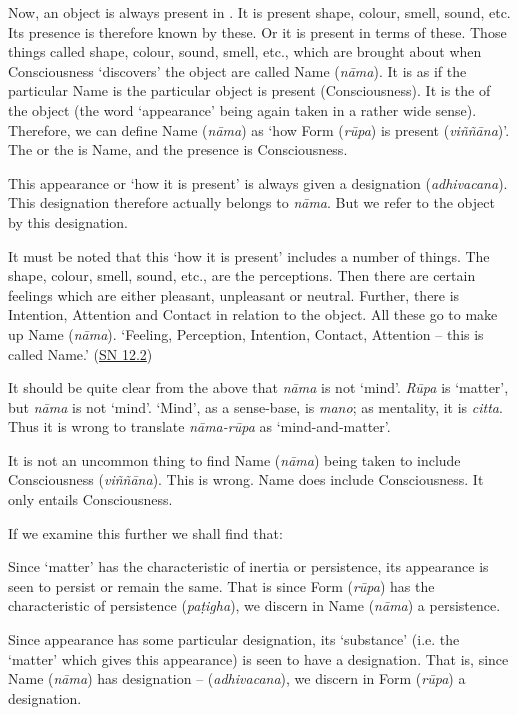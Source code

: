 Now, an object is always present in . It is present  shape, colour, smell, sound, etc. Its presence is therefore known by these. Or it is present in terms of these. Those things called shape, colour, sound, smell, etc., which are brought about when Consciousness `discovers' the object are called Name (\emph{nāma}). It is as if the particular Name is  the particular object is present (Consciousness). It is the  of the object (the word `appearance' being again taken in a rather wide sense). Therefore, we can define Name (\emph{nāma}) as `how Form (\emph{rūpa}) is present (\emph{viññāna})'. The  or the  is Name, and the presence is Consciousness.

This appearance or `how it is present' is always given a designation (\emph{adhivacana}). This designation therefore actually belongs to \emph{nāma}. But we refer to the object by this designation.

It must be noted that this `how it is present' includes a number of things. The shape, colour, smell, sound, etc., are the perceptions. Then there are certain feelings which are either pleasant, unpleasant or neutral. Further, there is Intention, Attention and Contact in relation to the object. All these go to make up Name (\emph{nāma}). `Feeling, Perception, Intention, Contact, Attention -- this is called Name.' (\href{https://suttacentral.net/sn12.2/en/bodhi}{SN 12.2})

It should be quite clear from the above that \emph{nāma} is not `mind'. \emph{Rūpa} is `matter', but \emph{nāma} is not `mind'. `Mind', as a sense-base, is \emph{mano}; as mentality, it is \emph{citta}. Thus it is wrong to translate \emph{nāma-rūpa} as `mind-and-matter'.

It is not an uncommon thing to find Name (\emph{nāma}) being taken to include Consciousness (\emph{viññāna}). This is wrong. Name does  include Consciousness. It only entails Consciousness.

If we examine this further we shall find that:

 Since `matter' has the characteristic of inertia or persistence, its appearance is seen to persist or remain the same. That is since Form (\emph{rūpa}) has the characteristic of persistence (\emph{paṭigha}), we discern in Name (\emph{nāma}) a persistence.

 Since appearance has some particular designation, its `substance' (i.e. the `matter' which gives this appearance) is seen to have a designation. That is, since Name (\emph{nāma}) has designation -- (\emph{adhivacana}), we discern in Form (\emph{rūpa}) a designation.

